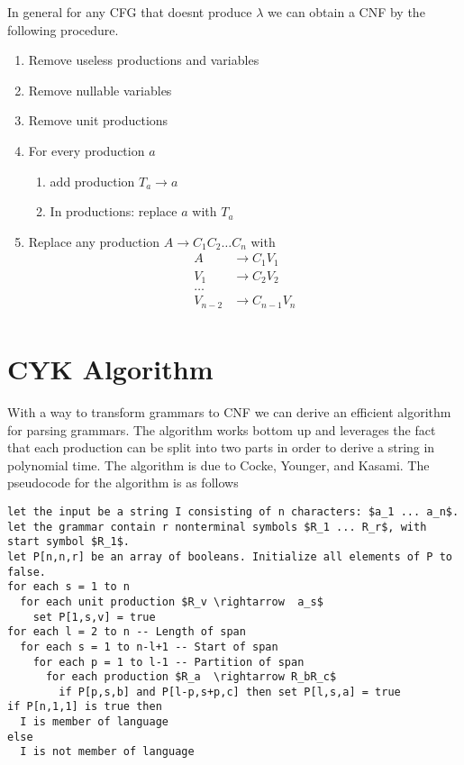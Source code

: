 \documentclass[11pt]{exam}
\begin{document}
In general for any CFG that doesnt produce $\lambda$ we can obtain a CNF by the following procedure.

\begin{enumerate}
\item Remove useless productions and variables\\
\item Remove nullable variables\\
\item Remove unit productions\\
\item For every production $a$\\
\begin{enumerate}
\item add production $T_a \rightarrow a$\\
\item In productions: replace $a$ with $T_a$\\
\end{enumerate}
\item Replace any production $A \rightarrow C_1C_2\dots C_n$ with \begin{align*}
A &\rightarrow C_1V_1\\
V_1 &\rightarrow C_2V_2\\
\dots\\
V_{n-2} &\rightarrow C_{n-1}V_n\\
\end{align*}
\end{enumerate}

\newpage


\section{CYK Algorithm}

With a way to transform grammars to CNF we can derive an efficient algorithm for parsing grammars. The algorithm works bottom up and leverages the fact that each production can be split into two parts in order to derive a string in polynomial time. The algorithm is due to Cocke, Younger, and Kasami. The pseudocode for the algorithm is as follows
\begin{lstlisting}[mathescape=true]
let the input be a string I consisting of n characters: $a_1 ... a_n$.
let the grammar contain r nonterminal symbols $R_1 ... R_r$, with start symbol $R_1$.
let P[n,n,r] be an array of booleans. Initialize all elements of P to false.
for each s = 1 to n
  for each unit production $R_v \rightarrow  a_s$
    set P[1,s,v] = true
for each l = 2 to n -- Length of span
  for each s = 1 to n-l+1 -- Start of span
    for each p = 1 to l-1 -- Partition of span
      for each production $R_a  \rightarrow R_bR_c$
        if P[p,s,b] and P[l-p,s+p,c] then set P[l,s,a] = true
if P[n,1,1] is true then
  I is member of language
else
  I is not member of language
\end{lstlisting}
\end{document}
